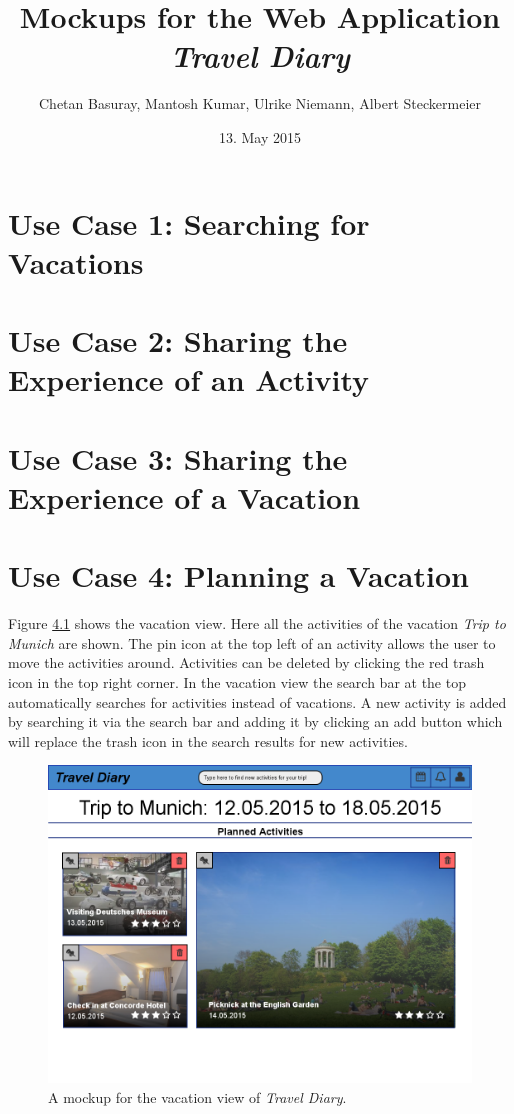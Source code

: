 \documentclass[IN,english]{tumbook}
\title{Mockups for the Web Application \emph{Travel Diary}}
\author{Chetan Basuray, Mantosh Kumar, Ulrike Niemann, Albert Steckermeier}
\date{13. May 2015}
\begin{document}
\maketitle
\newpage
\tableofcontents
\newpage

\chapter{Use Case 1: Searching for Vacations}

\chapter{Use Case 2: Sharing the Experience of an Activity}

\chapter{Use Case 3: Sharing the Experience of a Vacation}

\chapter{Use Case 4: Planning a Vacation}

Figure \ref{fig:usecase4} shows the vacation view. Here all the activities of the vacation \emph{Trip to Munich} are shown. The pin icon at the top left of an activity allows the user to move the activities around. Activities can be deleted by clicking the red trash icon in the top right corner. In the vacation view the search bar at the top automatically searches for activities instead of vacations. A new activity is added by searching it via the search bar and adding it by clicking an add button which will replace the trash icon in the search results for new activities.

\begin{figure}
	\begin{center}
		\includegraphics[scale=0.5]{graphics/usecase4}
	\end{center}
	\label{fig:usecase4}
	\caption{A mockup for the vacation view of \emph{Travel Diary}.}
\end{figure}
\end{document}
